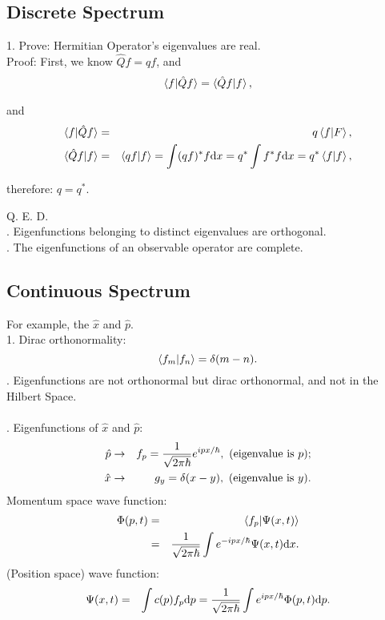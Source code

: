 \documentclass[12pt, 
]{article}
\begin{document}
\subsection{Discrete Spectrum}
1. Prove: Hermitian Operator's eigenvalues are real.\\
Proof: First, we know $\hat{Q}f=qf$, and 
\begin{eqnarray*}
	\braket{f|\hat{Q}f}=\braket{\hat{Q}f|f},
\end{eqnarray*}

and 
\begin{eqnarray*}
	\braket{f|\hat{Q}f}&=&q\braket{f|F},\\
	\braket{\hat{Q}f|f}&=&\braket{qf|f}=\int(qf)^*f{\rm d}x=q^*\int f^*f{\rm d}x=q^*\braket{f|f},
\end{eqnarray*}

therefore: $q=q^*$.

Q. E. D.
~\\

. Eigenfunctions belonging to distinct eigenvalues are orthogonal.~\\

. The eigenfunctions of an observable operator are complete.~\\

\subsection{Continuous Spectrum}
For example, the $\hat{x}$ and $\hat{p}$.\\
1. Dirac orthonormality:
\[
	\braket{f_m|f_n}=\delta(m-n).
\]
. Eigenfunctions are not orthonormal but dirac orthonormal, and not in the Hilbert Space.\\
~\\
. Eigenfunctions of $\hat{x}$ and $\hat{p}$:
\begin{eqnarray*}
	\hat{p}&\rightarrow&f_p=\frac{1}{\sqrt{2\pi\hbar}}e^{ipx/\hbar},~({\rm eigenvalue~is}~p);\\
	\hat{x}&\rightarrow&g_y=\delta(x-y),~({\rm eigenvalue~is}~y).
\end{eqnarray*}
Momentum space wave function:
\begin{eqnarray*}
	\Phi(p,t)&=&\braket{f_p|\Psi(x,t)}\\
	&=&\frac{1}{\sqrt{2\pi\hbar}}\int e^{-ipx/\hbar}\Psi(x,t){\rm d}x.
\end{eqnarray*}
(Position space) wave function:
\begin{eqnarray*}
	\Psi(x,t)&=&\int c(p)f_p{\rm d}p=\frac{1}{\sqrt{2\pi\hbar}}\int e^{ipx/\hbar}\Phi(p,t){\rm d}p.
\end{eqnarray*}
\end{document}
